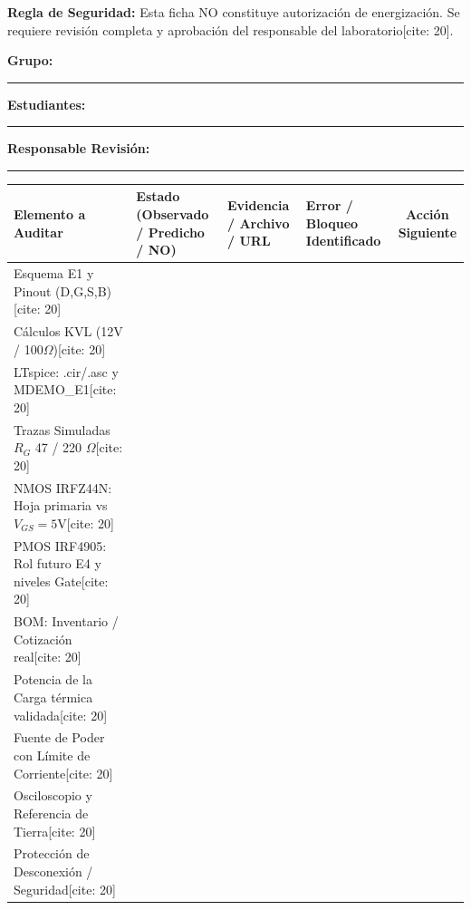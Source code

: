\documentclass[10pt, a4paper, landscape]{article}
\begin{document}
\begin{tcolorbox}[colback=ucbblue!5, colframe=ucbblue, title=\textbf{Ficha Operativa de Seguimiento y Auditoría G1 — W13S01, 27 Octubre 2026[cite: 20]}]
    \textbf{Regla de Seguridad:} Esta ficha NO constituye autorización de energización. Se requiere revisión completa y aprobación del responsable del laboratorio[cite: 20].
\end{tcolorbox}

\noindent \textbf{Grupo:} \rule{3cm}{0.15mm} \quad \textbf{Estudiantes:} \rule{8cm}{0.15mm} \quad \textbf{Responsable Revisión:} \rule{4cm}{0.15mm}

\vspace{0.3cm}
\renewcommand{\arraystretch}{1.8}
\begin{tabularx}{\textwidth}{|>{\raggedright\arraybackslash}p{4cm}|>{\raggedright\arraybackslash}p{3cm}|>{\raggedright\arraybackslash}X|>{\raggedright\arraybackslash}p{4cm}|c|}
\hline
\rowcolor{gray!20}
\textbf{Elemento a Auditar} & \textbf{Estado (Observado / Predicho / NO)} & \textbf{Evidencia / Archivo / URL} & \textbf{Error / Bloqueo Identificado} & \textbf{Acción Siguiente} \\ \hline
Esquema E1 y Pinout (D,G,S,B)[cite: 20] & & & & \\ \hline
Cálculos KVL (12V / 100$\Omega$)[cite: 20] & & & & \\ \hline
LTspice: .cir/.asc y MDEMO\_E1[cite: 20] & & & & \\ \hline
Trazas Simuladas $R_G$ 47 / 220 $\Omega$[cite: 20] & & & & \\ \hline
NMOS IRFZ44N: Hoja primaria vs $V_{GS}=5\text{V}$[cite: 20] & & & & \\ \hline
PMOS IRF4905: Rol futuro E4 y niveles Gate[cite: 20] & & & & \\ \hline
BOM: Inventario / Cotización real[cite: 20] & & & & \\ \hline
Potencia de la Carga térmica validada[cite: 20] & & & & \\ \hline
Fuente de Poder con Límite de Corriente[cite: 20] & & & & \\ \hline
Osciloscopio y Referencia de Tierra[cite: 20] & & & & \\ \hline
Protección de Desconexión / Seguridad[cite: 20] & & & & \\ \hline
\end{tabularx}
\end{document}
